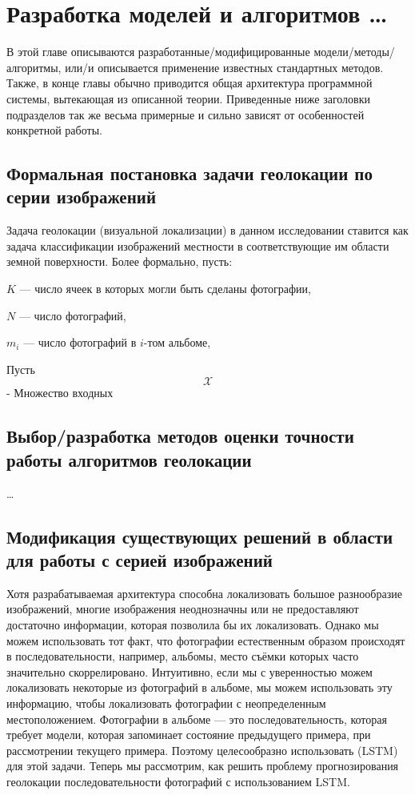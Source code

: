  \chapter{Разработка моделей и алгоритмов \dots}

В этой главе описываются разработанные/модифицированные модели/методы/
алгоритмы, или/и описывается применение известных стандартных методов. Также, 
в конце главы обычно приводится общая архитектура программной системы, 
вытекающая из описанной теории. Приведенные ниже заголовки подразделов так же 
весьма примерные и сильно зависят от особенностей конкретной работы.
\section{Формальная постановка задачи геолокации по серии изображений}

Задача геолокации (визуальной локализации) в данном исследовании ставится как задача классификации изображений местности в соответствующие им области земной поверхности. Более формально, пусть:

\begin{compactitem}
	\item $K$ --- число ячеек в которых могли быть сделаны фотографии,
	\item $N$ --- число фотографий,
	\item $m_i$ --- число фотографий в $i$-том альбоме, 
	
\end{compactitem}
Пусть \[\mathcal{X}\] - Множество входных

\section{Выбор/разработка методов оценки точности работы алгоритмов геолокации}

\dots


\section{Модификация существующих решений в области для работы с серией изображений}

Хотя разрабатываемая архитектура способна локализовать большое разнообразие изображений, многие изображения неоднозначны или не предоставляют достаточно информации, которая позволила бы их локализовать.
Однако мы можем использовать тот факт, что фотографии естественным образом происходят в последовательности, например, альбомы, место съёмки которых часто значительно скоррелировано. Интуитивно, если мы с уверенностью можем локализовать
некоторые из фотографий в альбоме, мы можем использовать эту информацию,
чтобы локализовать фотографии с неопределенным местоположением. Фотографии в альбоме --- это последовательность,
которая требует модели, которая запоминает состояние предыдущего примера, 
при рассмотрении текущего примера. Поэтому целесообразно использовать
(LSTM) \cite{hochreiter1997long} для этой задачи.
Теперь мы рассмотрим, как решить проблему прогнозирования
геолокации последовательности фотографий с использованием LSTM.

